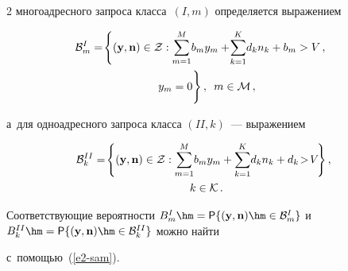 \begin{multicols}{2}
многоадресного запроса класса~$({I},m)$ определяется выражением



\vspace*{-6pt}



\noindent

  \begin{multline*}

  \hspace*{-8pt}\mathcal{B}_m^I= \!\left\{ (\mathbf{y},\mathbf{n})\in\mathcal{Z} : 

\sum\limits^M_{m=1}\! b_my_m +\!\sum\limits^K_{k=1} \!d_k n_k+b_m > V\,,\right.\\  

\left.y_m=0

\vphantom{\sum\limits^M_{m=1}}

\right\},\enskip m\in \mathcal{M}\,,


  \end{multline*}

а~для одноадресного запроса класса $({II},k)$~--- выражением



\vspace*{-2pt}



\noindent

\begin{multline*}

\hspace*{-7pt}\mathcal{B}_k^{II} =\!\left\{ (\mathbf{y},\mathbf{n}) \in\mathcal{Z} : 

\sum\limits^M_{m=1} \!b_m y_m +\sum\limits^K_{k=1}\! d_k n_k +d_k 

\!>\!V\!\right\},\hspace*{-1.89pt}\\

 k\in\mathcal{K}\,.


\end{multline*}

  

  Соответствующие вероятности $B_m^I\hm= {\sf P}\{ (\mathbf{y}, 

\mathbf{n})\hm\in \mathcal{B}^I_m\}$ и~$B_k^{II} \hm= {\sf P}\{ 

(\mathbf{y},\mathbf{n})\hm\in \mathcal{B}_k^{II}\}$ можно найти  

с~по\-мощью~(\ref{e2-sam}).




\end{multicols}
